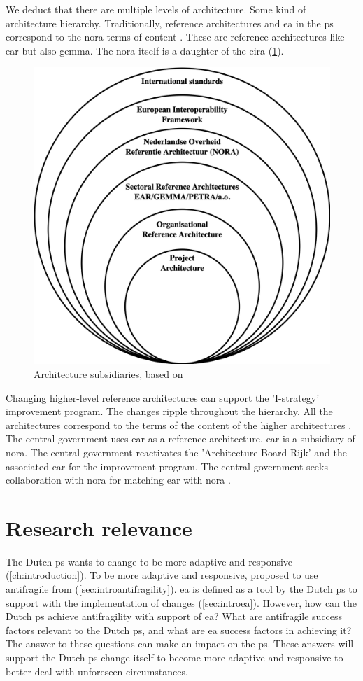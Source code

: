 We deduct that there are multiple levels of architecture. Some kind of architecture hierarchy. Traditionally, reference architectures and \acrlong{ea} in the \gls{ps} correspond to the \acrshort{nora} terms of content \parencite{NORAfamilie}. These are reference architectures like \acrshort{ear} but also \acrfull{gemma}. The \acrshort{nora} itself is a daughter of the \acrfull{eira} (\cref{fig:architectureviewonion}).
\begin{figure}[H]
	\centering
	\includegraphics[width=0.5\linewidth]{images/architectureviewonion}
	\caption[Architecture subsidiaries, based on \parencite{Greefhorst2008}]{Architecture subsidiaries, based on \parencite{Greefhorst2008}}
	\label{fig:architectureviewonion}
\end{figure}
Changing higher-level reference architectures can support the 'I-strategy' improvement program. The changes ripple throughout the hierarchy. All the architectures correspond to the terms of the content of the higher architectures \parencite{NORAfamilie}. The central government uses \acrshort{ear} as a reference architecture. \acrshort{ear} is a subsidiary of \acrshort{nora}. The central government reactivates the 'Architecture Board Rijk' and the associated \acrshort{ear} for the improvement program. The central government seeks collaboration with \acrshort{nora} for matching \acrshort{ear} with \acrshort{nora} \parencite[p.~42]{Digitaleoverheid2021}.

\section{Research relevance}
\label{sec:researchrelevance}
The Dutch \gls{ps} wants to change to be more adaptive and responsive (\cref{ch:introduction}). To be more adaptive and responsive, \textcite{Steen2018} proposed to use \gls{antifragile} from \textcite{Taleb2012} (\cref{sec:introantifragility}). \acrlong{ea} is defined as a tool by the Dutch \gls{ps} to support with the implementation of changes (\cref{sec:introea}). However, how can the Dutch \gls{ps} achieve \gls{antifragility} with support of \acrlong{ea}? What are \gls{antifragile} success factors relevant to the Dutch \gls{ps}, and what are \acrlong{ea} success factors in achieving it? The answer to these questions can make an impact on the \gls{ps}. These answers will support the Dutch \gls{ps} change itself to become more adaptive and responsive to better deal with unforeseen circumstances.


